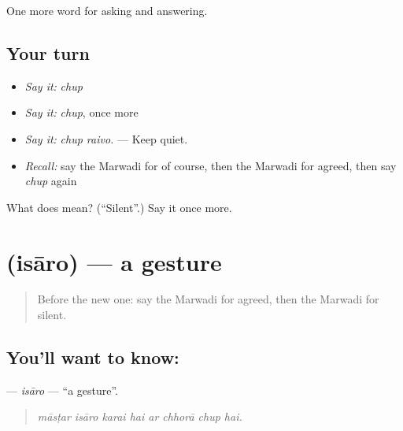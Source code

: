 \begin{grammarlens}[title={What you've built}]
One more word for asking and answering.
\end{grammarlens}

\subsection*{Your turn}
\begin{itemize}
\raggedright
  \item \emph{Say it:} \emph{chup}
  \item \emph{Say it:} \emph{chup}, once more
  \item \emph{Say it:} \emph{chup raivo.} — Keep quiet.
  \item \emph{Recall:} say the Marwadi for of course, then the Marwadi for agreed, then say \emph{chup} again
\end{itemize}

\begin{tcolorbox}[breakable,colback=teal!4,colframe=teal!35!black,title={Before you move on}]
What does  mean? (\textquotedblleft{}Silent\textquotedblright{}.) Say it once more.
\end{tcolorbox}
\section[\texorpdfstring{\mw{इसारो} (isāro)}{इसारो (isāro)}]{ (isāro) — a gesture}

\label{lesson:MW-C273-isaro}



\begin{quote}
Before the new one: say the Marwadi for agreed, then the Marwadi for silent.
\end{quote}

\subsection*{You'll want to know: }
\textbf{} — \emph{isāro} — \textquotedblleft{}a gesture\textquotedblright{}.

\begin{quote}
       
\end{quote}

\begin{quote}
\emph{māsṭar isāro karai hai ar chhorā chup hai.}
\end{quote}

